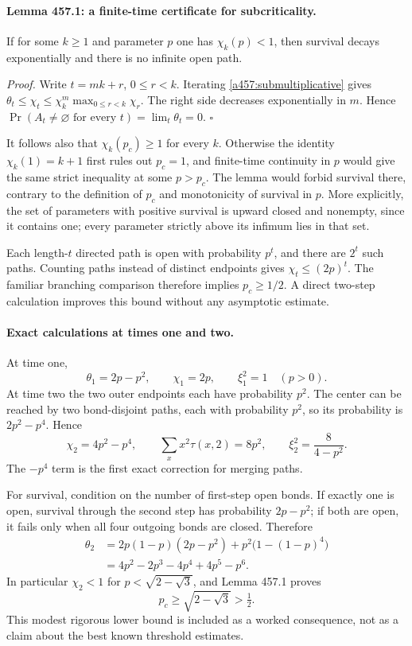 \documentclass[11pt]{article}
\begin{document}
\paragraph{Lemma 457.1: a finite-time certificate for subcriticality.}
If for some $k\ge1$ and parameter $p$ one has $\chi_k(p)<1$, then
survival decays exponentially and there is no infinite open path.

\emph{Proof.} Write $t=mk+r$, $0\le r<k$. Iterating
\eqref{a457:submultiplicative} gives
$\theta_t\le\chi_t\le\chi_k^m\max_{0\le r<k}\chi_r$.
The right side decreases exponentially in $m$. Hence
$\Pr(A_t\ne\varnothing\text{ for every }t)=\lim_t\theta_t=0$.
\hfill$\square$

It follows also that $\chi_k(p_c)\ge1$ for every $k$. Otherwise
the identity $\chi_k(1)=k+1$ first rules out $p_c=1$, and
finite-time continuity in $p$ would give the same strict inequality at
some $p>p_c$. The lemma would forbid survival there, contrary to the
definition of $p_c$ and monotonicity of survival in $p$. More explicitly,
the set of parameters with positive survival is upward closed and
nonempty, since it contains one; every parameter strictly above its
infimum lies in that set.

Each length-$t$ directed path is open with probability $p^t$, and there
are $2^t$ such paths. Counting paths instead of distinct endpoints gives
$\chi_t\le(2p)^t$. The familiar branching comparison therefore implies
$p_c\ge1/2$. A direct two-step calculation improves this bound without
any asymptotic estimate.

\paragraph{Exact calculations at times one and two.}
At time one,
\[
 \theta_1=2p-p^2,\qquad\chi_1=2p,\qquad\xi_1^2=1\quad(p>0).
\]
At time two the two outer endpoints each have probability $p^2$.
The center can be reached by two bond-disjoint paths, each with
probability $p^2$, so its probability is $2p^2-p^4$. Hence
\begin{equation}\label{a457:time2}
 \chi_2=4p^2-p^4,\qquad
 \sum_xx^2\tau(x,2)=8p^2,\qquad
 \xi_2^2=\frac8{4-p^2}.
\end{equation}
The $-p^4$ term is the first exact correction for merging paths.

For survival, condition on the number of first-step open bonds. If
exactly one is open, survival through the second step has probability
$2p-p^2$; if both are open, it fails only when all four outgoing bonds
are closed. Therefore
\begin{align*}
 \theta_2
 &=2p(1-p)(2p-p^2)+p^2\bigl(1-(1-p)^4\bigr)\\
 &=4p^2-2p^3-4p^4+4p^5-p^6.
\end{align*}
In particular $\chi_2<1$ for
$p<\sqrt{2-\sqrt3}$, and Lemma 457.1 proves
\[
 p_c\ge\sqrt{2-\sqrt3}>\tfrac12.
\]
This modest rigorous lower bound is included as a worked consequence,
not as a claim about the best known threshold estimates.
\end{document}
